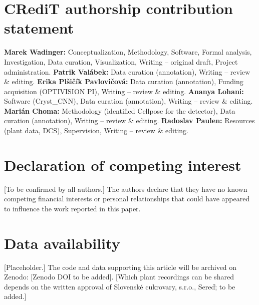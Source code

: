 
\section*{CRediT authorship contribution statement}
\textbf{Marek Wadinger:} Conceptualization, Methodology, Software, Formal analysis, Investigation, Data curation,
Visualization, Writing -- original draft, Project administration. \textbf{Patrik Val\'abek:} Data curation
(annotation), Writing -- review \& editing. \textbf{Erika Pl\v{s}i\v{c}\'ik Pavlovi\v{c}ov\'a:} Data curation
(annotation), Funding acquisition (OPTIVISION PI), Writing -- review \& editing. \textbf{Ananya Lohani:} Software
(Cryst\_CNN), Data curation (annotation), Writing -- review \& editing. \textbf{Mari\'an Choma:} Methodology
(identified Cellpose for the detector), Data curation (annotation), Writing -- review \& editing. \textbf{Radoslav
Paulen:} Resources (plant data, DCS), Supervision, Writing -- review \& editing.

\section*{Declaration of competing interest}
[To be confirmed by all authors.] The authors declare that they have no known competing financial interests or
personal relationships that could have appeared to influence the work reported in this paper.

\section*{Data availability}
[Placeholder.] The code and data supporting this article will be archived on Zenodo: [Zenodo DOI to be added].
[Which plant recordings can be shared depends on the written approval of Slovensk\'e cukrovary, s.r.o., Sere\v{d};
to be added.]

